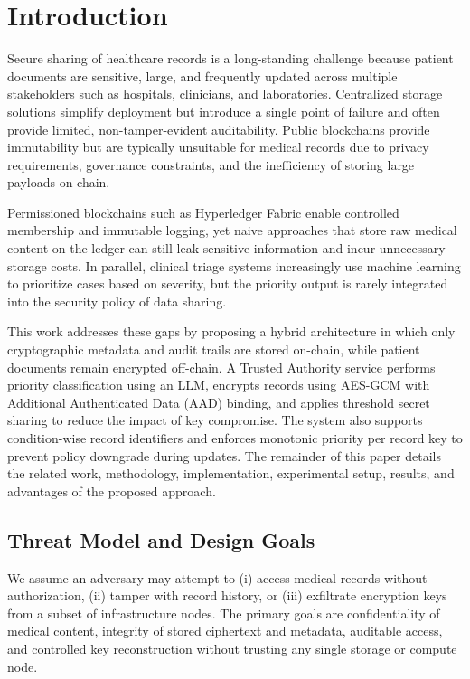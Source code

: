 \documentclass{IEEEtran}
\begin{document}
\section{Introduction}
\label{sec:introduction}
Secure sharing of healthcare records is a long-standing challenge because patient documents are sensitive, large, and frequently updated across multiple stakeholders such as hospitals, clinicians, and laboratories. Centralized storage solutions simplify deployment but introduce a single point of failure and often provide limited, non-tamper-evident auditability. Public blockchains provide immutability but are typically unsuitable for medical records due to privacy requirements, governance constraints, and the inefficiency of storing large payloads on-chain.

Permissioned blockchains such as Hyperledger Fabric enable controlled membership and immutable logging, yet naive approaches that store raw medical content on the ledger can still leak sensitive information and incur unnecessary storage costs. In parallel, clinical triage systems increasingly use machine learning to prioritize cases based on severity, but the priority output is rarely integrated into the security policy of data sharing.

This work addresses these gaps by proposing a hybrid architecture in which only cryptographic metadata and audit trails are stored on-chain, while patient documents remain encrypted off-chain. A Trusted Authority service performs priority classification using an LLM, encrypts records using AES-GCM with Additional Authenticated Data (AAD) binding, and applies threshold secret sharing to reduce the impact of key compromise. The system also supports condition-wise record identifiers and enforces monotonic priority per record key to prevent policy downgrade during updates. The remainder of this paper details the related work, methodology, implementation, experimental setup, results, and advantages of the proposed approach.

\subsection{Threat Model and Design Goals}
We assume an adversary may attempt to (i) access medical records without authorization, (ii) tamper with record history, or (iii) exfiltrate encryption keys from a subset of infrastructure nodes. The primary goals are confidentiality of medical content, integrity of stored ciphertext and metadata, auditable access, and controlled key reconstruction without trusting any single storage or compute node.
\end{document}
